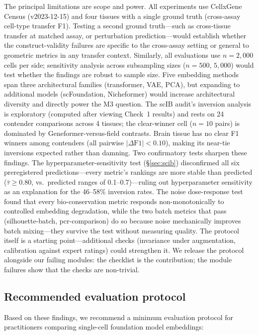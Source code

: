 \documentclass[10pt,letterpaper]{article}
\begin{document}
The principal limitations are scope and power. All experiments use CellxGene Census (v2023-12-15) and four tissues with a single ground truth (cross-assay cell-type transfer F1). Testing a second ground truth---such as cross-tissue transfer at matched assay, or perturbation prediction---would establish whether the construct-validity failures are specific to the cross-assay setting or general to geometric metrics in any transfer context. Similarly, all evaluations use $n = 2{,}000$ cells per side; sensitivity analysis across subsampling sizes ($n = 500$, $5{,}000$) would test whether the findings are robust to sample size. Five embedding methods span three architectural families (transformer, VAE, PCA), but expanding to additional models (scFoundation, Nicheformer) would increase architectural diversity and directly power the M3 question. The scIB audit's inversion analysis is exploratory (computed after viewing Check~1 results) and rests on 24 contender comparisons across 4 tissues; the clear-winner cell ($n = 10$ pairs) is dominated by Geneformer-versus-field contrasts. Brain tissue has no clear F1 winners among contenders (all pairwise $|\Delta\text{F1}| < 0.10$), making its near-tie inversions expected rather than damning. Two confirmatory tests sharpen these findings. The hyperparameter-sensitivity test (\S\ref{sec:scib}) disconfirmed all six preregistered predictions---every metric's rankings are more stable than predicted ($\bar{\tau} \geq 0.80$, vs.\ predicted ranges of 0.1--0.7)---ruling out hyperparameter sensitivity as an explanation for the 46--58\% inversion rates. The noise dose-response test found that every bio-conservation metric responds non-monotonically to controlled embedding degradation, while the two batch metrics that pass (silhouette-batch, pcr-comparison) do so because noise mechanically improves batch mixing---they survive the test without measuring quality. The protocol itself is a starting point---additional checks (invariance under augmentation, calibration against expert ratings) could strengthen it. We release the protocol alongside our failing modules: the checklist is the contribution; the module failures show that the checks are non-trivial.

\subsection{Recommended evaluation protocol}

Based on these findings, we recommend a minimum evaluation protocol for practitioners comparing single-cell foundation model embeddings:
\end{document}
